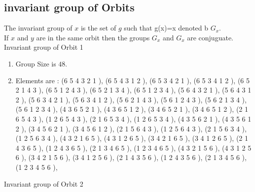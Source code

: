 \documentclass[12pt]{article}
\begin{document}
\subsection{invariant group of Orbits}
\noindent The invariant group of $x$ is the set of $g$ such that g(x)=x denoted b $G_x$.\\
If $x$ and $y$ are in the same orbit then the groups $G_x$ and  $G_x$ are conjuguate.\\
Invariant group of Orbit 1
\begin{enumerate}
\item Group Size is $48$.
\item Elements are : (6 5 4 3 2 1  ), (6 5 4 3 1 2  ), (6 5 3 4 2 1  ), (6 5 3 4 1 2  ), (6 5 2 1 4 3  ), (6 5 1 2 4 3  ), (6 5 2 1 3 4  ), (6 5 1 2 3 4  ), (5 6 4 3 2 1  ), (5 6 4 3 1 2  ), (5 6 3 4 2 1  ), (5 6 3 4 1 2  ), (5 6 2 1 4 3  ), (5 6 1 2 4 3  ), (5 6 2 1 3 4  ), (5 6 1 2 3 4  ), (4 3 6 5 2 1  ), (4 3 6 5 1 2  ), (3 4 6 5 2 1  ), (3 4 6 5 1 2  ), (2 1 6 5 4 3  ), (1 2 6 5 4 3  ), (2 1 6 5 3 4  ), (1 2 6 5 3 4  ), (4 3 5 6 2 1  ), (4 3 5 6 1 2  ), (3 4 5 6 2 1  ), (3 4 5 6 1 2  ), (2 1 5 6 4 3  ), (1 2 5 6 4 3  ), (2 1 5 6 3 4  ), (1 2 5 6 3 4  ), (4 3 2 1 6 5  ), (4 3 1 2 6 5  ), (3 4 2 1 6 5  ), (3 4 1 2 6 5  ), (2 1 4 3 6 5  ), (1 2 4 3 6 5  ), (2 1 3 4 6 5  ), (1 2 3 4 6 5  ), (4 3 2 1 5 6  ), (4 3 1 2 5 6  ), (3 4 2 1 5 6  ), (3 4 1 2 5 6  ), (2 1 4 3 5 6  ), (1 2 4 3 5 6  ), (2 1 3 4 5 6  ), (1 2 3 4 5 6  ), 
\end{enumerate}
Invariant group of Orbit 2
\end{document}
